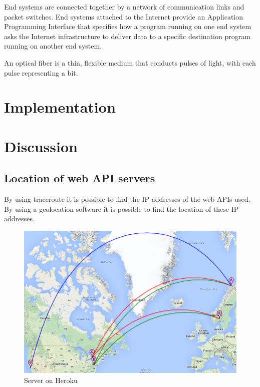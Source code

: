 \documentclass[10pt,a4paper]{article}
\begin{document}
End systems are connected together by a network of communication links and packet switches. 
End systems attached to the Internet provide an Application Programming Interface that specifies how a program running on one end system asks the Internet infrastructure to deliver data to a specific destination program running on another end system. 

An optical fiber is a thin, flexible medium that conducts pulses of light, with each pulse representing a bit. 

\section{Implementation}

\section{Discussion}

\subsection{Location of web API servers}
By using traceroute it is possible to find the IP addresses of the web APIs used. By using a geolocation software it is possible to find the location of these IP addresses.
\begin{figure}
\centering
\includegraphics[width=\textwidth]{../traceroute/heroku_markers}
\caption{Server on Heroku}
\label{traceroute_heroku}
\end{figure}
\end{document}
